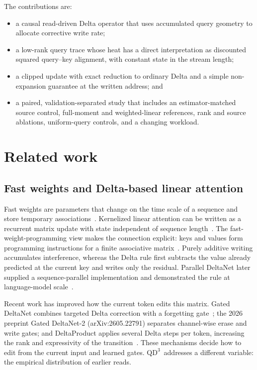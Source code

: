 \documentclass[pdflatex,sn-mathphys-num]{sn-jnl}
\theoremstyle{thmstyleone}
\newcommand{\QDDD}{\ensuremath{\mathrm{QD}^{3}}}
\begin{document}
The contributions are:
\begin{itemize}
  \item a causal read-driven Delta operator that uses accumulated query geometry to allocate corrective write rate;
  \item a low-rank query trace whose heat has a direct interpretation as discounted squared query--key alignment, with constant state in the stream length;
  \item a clipped update with exact reduction to ordinary Delta and a simple non-expansion guarantee at the written address; and
  \item a paired, validation-separated study that includes an estimator-matched source control, full-moment and weighted-linear references, rank and source ablations, uniform-query controls, and a changing workload.
\end{itemize}

\section{Related work}\label{sec:related}

\subsection{Fast weights and Delta-based linear attention}

Fast weights are parameters that change on the time scale of a sequence and store temporary associations~\cite{schmidhuber1992,ba2016}. Kernelized linear attention can be written as a recurrent matrix update with state independent of sequence length~\cite{katharopoulos2020}. The fast-weight-programming view makes the connection explicit: keys and values form programming instructions for a finite associative matrix~\cite{schlag2021}. Purely additive writing accumulates interference, whereas the Delta rule first subtracts the value already predicted at the current key and writes only the residual. Parallel DeltaNet later supplied a sequence-parallel implementation and demonstrated the rule at language-model scale~\cite{yang2024parallel}.

Recent work has improved how the current token edits this matrix. Gated DeltaNet combines targeted Delta correction with a forgetting gate~\cite{yang2025gated}; the 2026 preprint Gated DeltaNet-2 (arXiv:2605.22791) separates channel-wise erase and write gates; and DeltaProduct applies several Delta steps per token, increasing the rank and expressivity of the transition~\cite{siems2025deltaproduct}. These mechanisms decide how to edit from the current input and learned gates. \QDDD\ addresses a different variable: the empirical distribution of earlier reads.
\end{document}

